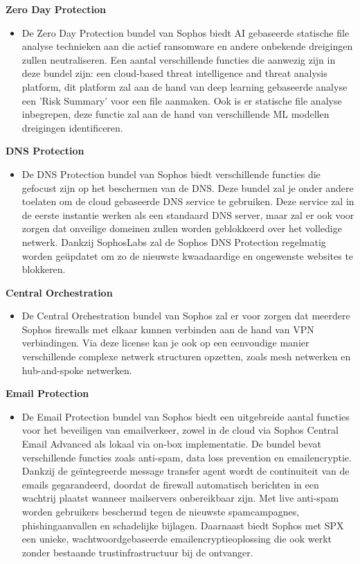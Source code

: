 \textbf{Zero Day Protection}
\begin{itemize}[label=\textbullet]
    \item De Zero Day Protection bundel van Sophos biedt AI gebaseerde statische file analyse technieken aan die actief ransomware en andere onbekende dreigingen zullen neutraliseren. Een aantal verschillende functies die aanwezig zijn in deze bundel zijn: een cloud-based threat intelligence and threat analysis platform, dit platform zal aan de hand van deep learning gebaseerde analyse een 'Risk Summary' voor een file aanmaken. Ook is er statische file analyse inbegrepen, deze functie zal aan de hand van verschillende ML modellen dreigingen identificeren.
\end{itemize}

\textbf{DNS Protection}
\begin{itemize}[label=\textbullet]
    \item De DNS Protection bundel van Sophos biedt verschillende functies die gefocust zijn op het beschermen van de DNS. Deze bundel zal je onder andere toelaten om de cloud gebaseerde DNS service te gebruiken. Deze service zal in de eerste instantie werken als een standaard DNS server, maar zal er ook voor zorgen dat onveilige domeinen zullen worden geblokkeerd over het volledige netwerk. Dankzij SophosLabs zal de Sophos DNS Protection regelmatig worden geüpdatet om zo de nieuwste kwaadaardige en ongewenste websites te blokkeren.
\end{itemize}

\textbf{Central Orchestration}
\begin{itemize}[label=\textbullet]
    \item De Central Orchestration bundel van Sophos zal er voor zorgen dat meerdere Sophos firewalls met elkaar kunnen verbinden aan de hand van VPN verbindingen. Via deze license kan je ook op een eenvoudige manier verschillende complexe netwerk structuren opzetten, zoals mesh netwerken en hub-and-spoke netwerken.
\end{itemize}

\textbf{Email Protection}
\begin{itemize}[label=\textbullet]
    \item De Email Protection bundel van Sophos biedt een uitgebreide aantal functies voor het beveiligen van emailverkeer, zowel in de cloud via Sophos Central Email Advanced als lokaal via on-box implementatie. De bundel bevat verschillende functies zoals anti-spam, data loss prevention en emailencryptie. Dankzij de geïntegreerde message transfer agent wordt de continuiteit van de emails gegarandeerd, doordat de firewall automatisch berichten in een wachtrij plaatst wanneer mailservers onbereikbaar zijn. Met live anti-spam worden gebruikers beschermd tegen de nieuwste spamcampagnes, phishingaanvallen en schadelijke bijlagen. Daarnaast biedt Sophos met SPX een unieke, wachtwoordgebaseerde emailencryptieoplossing die ook werkt zonder bestaande trustinfrastructuur bij de ontvanger.
\end{itemize}

